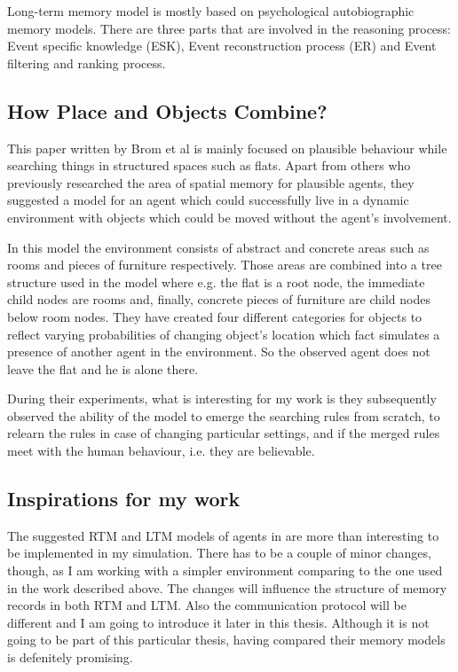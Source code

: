 Long-term memory model is mostly based on psychological autobiographic memory models. There are three parts that are involved in the reasoning process: Event specific knowledge (ESK), Event reconstruction process (ER) and Event filtering and ranking process.

\subsection{How Place and Objects Combine?}

This paper written by Brom et al \cite{Brom:placeandobjects} is mainly focused on plausible behaviour while searching things in structured spaces such as flats. Apart from others who previously researched the area of spatial memory for plausible agents, they suggested a model for an agent which could successfully live in a dynamic environment with objects which could be moved without the agent’s involvement. 

In this model the environment consists of abstract and concrete areas such as rooms and pieces of furniture respectively. Those areas are combined into a tree structure used in the model where e.g. the flat is a root node, the immediate child nodes are rooms and, finally, concrete pieces of furniture are child nodes below room nodes. They have created four different categories for objects to reflect varying probabilities of changing object’s location which fact simulates a presence of another agent in the environment. So the observed agent does not leave the flat and he is alone there.

During their experiments, what is interesting for my work is they subsequently observed the ability of the model to emerge the searching rules from scratch, to relearn the rules in case of changing particular settings, and if the merged rules meet with the human behaviour, i.e. they are believable. 
                 
\subsection{Inspirations for my work}

The suggested RTM and LTM models of agents in \cite{Ho:memoryarchitectures} are more than interesting to be implemented in my simulation. There has to be a couple of minor changes, though, as I am working with a simpler environment comparing to the one used in the work described above. The changes will influence the structure of memory records in both RTM and LTM. Also the communication protocol will be different and I am going to introduce it later in this thesis. Although it is not going to be part of this particular thesis, having compared their memory models is defenitely promising.

